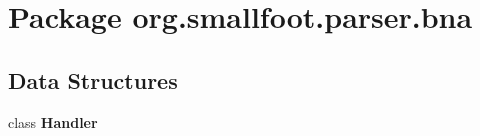 \section{Package org.\+smallfoot.\+parser.\+bna}
\label{namespaceorg_1_1smallfoot_1_1parser_1_1bna}
\subsection*{Data Structures}
\begin{DoxyCompactItemize}
\item 
class {\bf Handler}
\end{DoxyCompactItemize}
